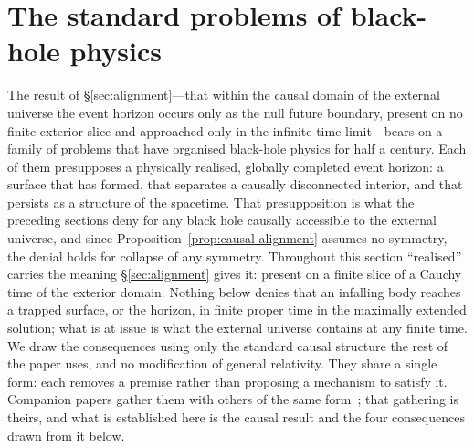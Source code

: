 \documentclass[11pt,a4paper]{article}
\theoremstyle{plain}
\theoremstyle{remark}
\begin{document}
\section{The standard problems of black-hole physics}\label{sec:problems}
The result of \S\ref{sec:alignment}---that within the causal domain of the external universe the event horizon occurs only as the null future boundary, present on no finite exterior slice and approached only in the infinite-time limit---bears on a family of problems that have organised black-hole physics for half a century. Each of them presupposes a physically realised, globally completed event horizon: a surface that has formed, that separates a causally disconnected interior, and that persists as a structure of the spacetime. That presupposition is what the preceding sections deny for any black hole causally accessible to the external universe, and since Proposition~\ref{prop:causal-alignment} assumes no symmetry, the denial holds for collapse of any symmetry. Throughout this section ``realised'' carries the meaning \S\ref{sec:alignment} gives it: present on a finite slice of a Cauchy time of the exterior domain. Nothing below denies that an infalling body reaches a trapped surface, or the horizon, in finite proper time in the maximally extended solution; what is at issue is what the external universe contains at any finite time. We draw the consequences using only the standard causal structure the rest of the paper uses, and no modification of general relativity. They share a single form: each removes a premise rather than proposing a mechanism to satisfy it. Companion papers gather them with others of the same form~\cite{JanzenCRframework}; that gathering is theirs, and what is established here is the causal result and the four consequences drawn from it below.
\end{document}
